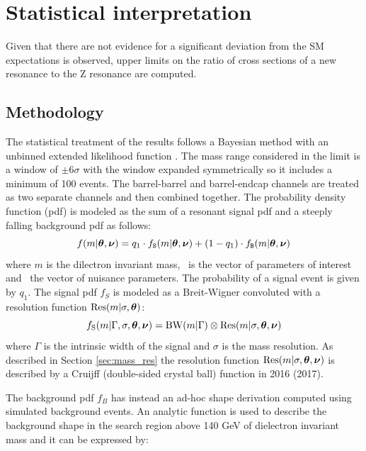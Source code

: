 \clearpage
\section{Statistical interpretation}
\label{sec:Zprime_Limit}
Given that there are not evidence for a significant deviation from the SM expectations is observed, upper limits on the ratio of cross sections of a new resonance to the Z resonance are computed.

\subsection*{Methodology}
The statistical treatment of the results follows a Bayesian method with an unbinned extended likelihood function \cite{CMS-AN-16-307,StatsPaper,StatsWorkshop}. The mass range considered in the limit is a window of $\pm6\sigma$ with the window expanded symmetrically so it includes a minimum of 100 events. The barrel-barrel and barrel-endcap channels are treated as two separate channels and then combined together.
The probability density function (pdf) is modeled as the sum of a resonant signal pdf and a steeply falling background pdf as follows:
\begin{equation}
\label{eq:model_pdf}
f(m|{\boldsymbol\theta},{\boldsymbol\nu}) = q_1 \cdot  f_\mathtt{S}(m|{\boldsymbol\theta},{\boldsymbol\nu})  + (1-q_1) \cdot  f_\mathtt{B}(m|{\boldsymbol\theta},{\boldsymbol\nu})
\end{equation}
where $m$ is the dilectron invariant mass, \btheta\ is the vector of parameters of interest and \bnu\ the vector of nuisance parameters. The probability of a signal event is given by $q_1$.
The signal pdf $f_{S}$ is modeled as a Breit-Wigner convoluted with a resolution function $\mathrm{Res}(m | \sigma ,{\boldsymbol\theta})$:
\begin{equation} \label{eq:sigpdf}
f_{\mathrm{S}} (m | \Gamma, \sigma, {\boldsymbol\theta}, {\boldsymbol\nu}) = \mathrm{BW}(m | \Gamma) \otimes \mathrm{Res} (m | \sigma ,{\boldsymbol\theta}, {\boldsymbol\nu})
\end{equation}
where $\Gamma$ is the intrinsic width of the signal and $\sigma$ is the mass resolution.
As described in Section \ref{sec:mass_res} the resolution function $\mathrm{Res}(m | \sigma ,{\boldsymbol\theta}, {\boldsymbol\nu})$ is described by a Cruijff (double-sided crystal ball) function in 2016 (2017).

The background pdf $f_{B}$ has instead an ad-hoc shape derivation computed using simulated background events. An analytic function is used to describe the background shape in the search region above 140 GeV of dielectron invariant mass and it can be expressed by:

